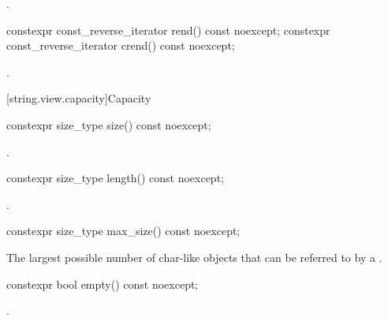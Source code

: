 \begin{itemdescr}
\pnum
\returns
{}.
\end{itemdescr}

%
%
\begin{itemdecl}
constexpr const_reverse_iterator rend() const noexcept;
constexpr const_reverse_iterator crend() const noexcept;
\end{itemdecl}

\begin{itemdescr}
\pnum
\returns
{}.
\end{itemdescr}

[string.view.capacity]{Capacity}

%
\begin{itemdecl}
constexpr size_type size() const noexcept;
\end{itemdecl}

\begin{itemdescr}
\pnum
\returns
{}.
\end{itemdescr}

%
\begin{itemdecl}
constexpr size_type length() const noexcept;
\end{itemdecl}

\begin{itemdescr}
\pnum
\returns
{}.
\end{itemdescr}

%
\begin{itemdecl}
constexpr size_type max_size() const noexcept;
\end{itemdecl}

\begin{itemdescr}
\pnum
\returns
The largest possible number of char-like objects that can be referred to by a .
\end{itemdescr}

%
\begin{itemdecl}
constexpr bool empty() const noexcept;
\end{itemdecl}

\begin{itemdescr}
\pnum
\returns
{}.
\end{itemdescr}

